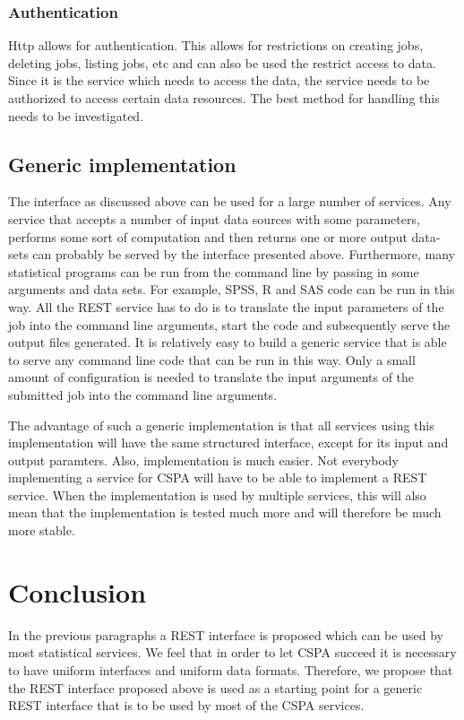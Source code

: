 \documentclass[a4paper]{article}
\begin{document}
\subsubsection{Authentication}
Http allows for authentication. This allows for restrictions on creating jobs,
deleting jobs, listing jobs, etc and can also be used the restrict access to
data. Since it is the service which needs to access the data, the service needs
to be authorized to access certain data resources. The best method for handling
this needs to be investigated. 


\subsection{Generic implementation}
The interface as discussed above can be used for a large number of services. Any
service that accepts a number of input data sources with some parameters,
performs some sort of computation and then returns one or more output data-sets
can probably be served by the interface presented above. Furthermore, many
statistical programs can be run from the command line by passing in some
arguments and data sets. For example, SPSS, R and SAS code can be run in this
way. All the REST service has to do is to translate the input parameters of the
job into the command line arguments, start the code and subsequently serve the
output files generated.  It is relatively easy to build a generic service that
is able to serve any command line code that can be run in this way. Only a small
amount of configuration is needed to translate the input arguments of the
submitted job into the command line arguments. 

The advantage of such a generic implementation is that all services using this
implementation will have the same structured interface, except for its input and output paramters. Also, implementation is
much easier. Not everybody implementing a service for CSPA will have to be able
to implement a REST service. When the implementation is used by multiple
services, this will also mean that the implementation is tested much more and
will therefore be much more stable. 




\section{Conclusion}

In the previous paragraphs a REST interface is proposed which can be used by
most statistical services. We feel that in order to let CSPA succeed it is
necessary to have uniform interfaces and uniform data
formats. Therefore, we propose that the REST interface proposed above is used as
a starting point for a generic REST interface that is to be used by most of the
CSPA services. 



\end{document}
